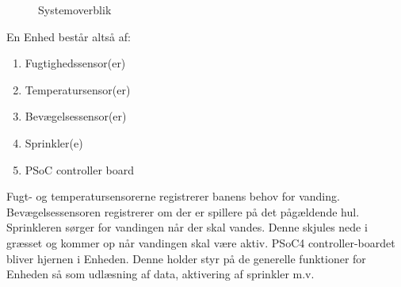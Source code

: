\begin{figure}[ht] \centering
{}
\caption{Systemoverblik}
\label{fig:bloksystemoverblik}
\end{figure}

En Enhed består altså af:
\begin{enumerate}
\item Fugtighedssensor(er)
\item Temperatursensor(er)
\item Bevægelsessensor(er) 
\item Sprinkler(e)
\item PSoC controller board
\end{enumerate}

Fugt- og temperatursensorerne registrerer banens behov for vanding. Bevægelsessensoren registrerer om der er spillere på det pågældende hul. Sprinkleren sørger for vandingen når der skal vandes. Denne skjules nede i græsset og kommer op når vandingen skal være aktiv.
PSoC4 controller-boardet bliver hjernen i Enheden. Denne holder styr på de generelle funktioner for Enheden så som udlæsning af data, aktivering af sprinkler m.v.